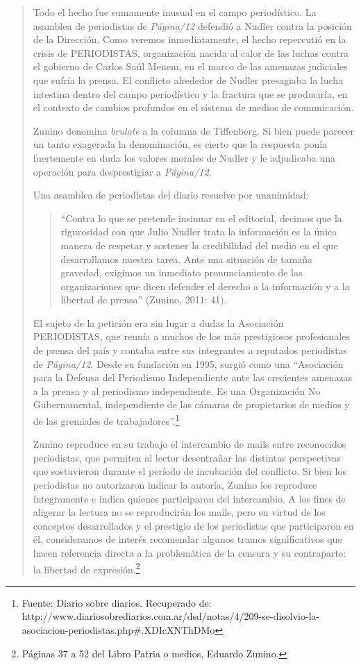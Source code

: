 \begin{quote}
Todo el hecho fue sumamente inusual en el campo periodístico. La asamblea de periodistas de \emph{Página/12} defendió a Nudler contra la posición de la Dirección. Como veremos inmediatamente, el hecho repercutió en la crisis de PERIODISTAS, organización nacida al calor de las luchas contra el gobierno de Carlos Saúl Menem, en el marco de las amenazas judiciales que sufría la prensa. El conflicto alrededor de Nudler presagiaba la lucha intestina dentro del campo periodístico y la fractura que se produciría, en el contexto de cambios profundos en el sistema de medios de comunicación.

Zunino denomina \emph{brulote} a la columna de Tiffenberg. Si bien puede parecer un tanto exagerada la denominación, es cierto que la respuesta ponía fuertemente en duda los valores morales de Nudler y le adjudicaba una operación para desprestigiar a \emph{Página/12}.

Una asamblea de periodistas del diario resuelve por unanimidad:

\begin{quote}
	\enquote{Contra lo que se pretende insinuar en el editorial, decimos que la rigurosidad con que Julio Nudler trata la información es la única manera de respetar y sostener la credibilidad del medio en el que desarrollamos nuestra tarea. Ante una situación de tamaña gravedad, exigimos un inmediato pronunciamiento de las organizaciones que dicen defender el derecho a la información y a la libertad de prensa} (Zunino, 2011: 41).
\end{quote}


El sujeto de la petición era sin lugar a dudas la Asociación PERIODISTAS, que reunía a muchos de los más prestigiosos profesionales de prensa del país y contaba entre sus integrantes a reputados periodistas de \emph{Página/12}. Desde su fundación en 1995, surgió como una ``Asociación para la Defensa del Periodismo Independiente ante las crecientes amenazas a la prensa y al periodismo independiente. Es una Organización No Gubernamental, independiente de las cámaras de propietarios de medios y de las gremiales de trabajadores''.\footnote{Fuente: Diario sobre diarios. Recuperado de: http://www.diariosobrediarios.com.ar/dsd/notas/4/209-se-disolvio-la-asociacion-periodistas.php#.XDIcXNThDMo}

Zunino reproduce en su trabajo el intercambio de mails entre reconocidos periodistas, que permiten al lector desentrañar las distintas perspectivas que sostuvieron durante el período de incubación del conflicto. Si bien los periodistas no autorizaron indicar la autoría, Zunino los reproduce íntegramente e indica quienes participaron del intercambio. A los fines de aligerar la lectura no se reproducirán los mails, pero en virtud de los conceptos desarrollados y el prestigio de los periodistas que participaron en él, consideramos de interés recomendar algunos tramos significativos que hacen referencia directa a la problemática de la censura y su contraparte: la libertad de expresión.\footnote{Páginas 37 a 52 del Libro Patria o medios, Eduardo Zunino.}


\end{quote}
